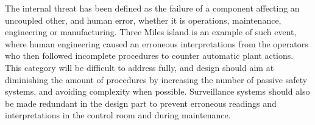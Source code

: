 The internal threat has been defined as the failure of a component affecting an uncoupled other, and human error, whether it is operations, maintenance, engineering or manufacturing. Three Miles island is an example of such event, where human engineering caused an erroneous interpretations from the operators who then followed incomplete procedures to counter automatic plant actions. This category will be difficult to address fully, and design should aim at diminishing the amount of procedures by increasing the number of passive safety systems, and avoiding complexity when possible. Surveillance systems should also be made redundant in the design part to prevent erroneous readings and interpretations in the control room and during maintenance.

